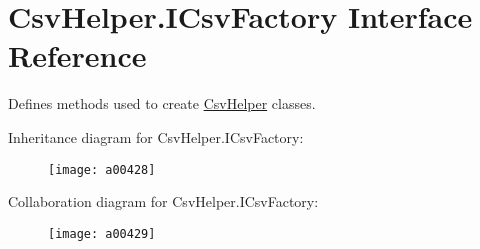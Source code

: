 \hypertarget{a00109}{\section{Csv\-Helper.\-I\-Csv\-Factory Interface Reference}
\label{a00109}
}


Defines methods used to create \hyperlink{a00314}{Csv\-Helper} classes.  




Inheritance diagram for Csv\-Helper.\-I\-Csv\-Factory\-:
\nopagebreak
\begin{figure}[H]
\begin{center}
\leavevmode
\texttt{[image: a00428]}
\end{center}
\end{figure}


Collaboration diagram for Csv\-Helper.\-I\-Csv\-Factory\-:
\nopagebreak
\begin{figure}[H]
\begin{center}
\leavevmode
\texttt{[image: a00429]}
\end{center}
\end{figure}
